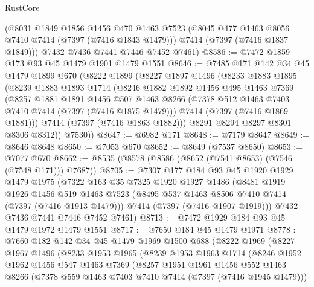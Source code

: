 \begin{lexlean}{RustCore}
\begin{coremodule}
      (@8031
        @1849
        @1856
        @1456
        @470
        @1463
        @7523
        (@8045 @477 @1463 @8056 @7410 @7414 (@7397 (@7416 @1843 @1479)))
        @7414
        (@7397 (@7416 @1837 @1849)))
      @7432
      @7436
      @7441
      @7446
      @7452
      @7461)
@8586 := @7472 @1859 @173 @93 @45 @1479 @1901 @1479 @1551
@8646 := @7485
    @171
    @142
    @34
    @45
    @1479
    @1899
    @670
    (@8222
      @1899
      (@8227
        @1897
        @1496
        (@8233
          @1883
          @1895
          (@8239
            @1883
            @1893
            @1714
            (@8246
              @1882
              @1892
              @1456
              @495
              @1463
              @7369
              (@8257
                @1881
                @1891
                @1456
                @507
                @1463
                @8266
                (@7378 @512 @1463 @7403 @7410 @7414 (@7397 (@7416 @1875 @1479)))
                @7414
                (@7397 (@7416 @1869 @1881)))
              @7414
              (@7397 (@7416 @1863 @1882)))
            @8291
            @8294
            @8297
            @8301
            @8306
            @8312))
        @7530))
@8647 := @6982 @171
@8648 := @7179 @8647
@8649 := @8646 @8648
@8650 := @7053 @670
@8652 := @8649 (@7537 @8650)
@8653 := @7077 @670
@8662 := @8535 (@8578 (@8586 (@8652 (@7541 @8653) (@7546 (@7548 @171))) @7687))
@8705 := @7307
    @177
    @184
    @93
    @45
    @1920
    @1929
    @1479
    @1975
    (@7322
      @163
      @35
      @7325
      @1920
      @1927
      @1486
      (@8481
        @1919
        @1926
        @1456
        @519
        @1463
        @7523
        (@8495 @537 @1463 @8506 @7410 @7414 (@7397 (@7416 @1913 @1479)))
        @7414
        (@7397 (@7416 @1907 @1919)))
      @7432
      @7436
      @7441
      @7446
      @7452
      @7461)
@8713 := @7472 @1929 @184 @93 @45 @1479 @1972 @1479 @1551
@8717 := @7650 @184 @45 @1479 @1971
@8778 := @7660
    @182
    @142
    @34
    @45
    @1479
    @1969
    @1500
    @688
    (@8222
      @1969
      (@8227
        @1967
        @1496
        (@8233
          @1953
          @1965
          (@8239
            @1953
            @1963
            @1714
            (@8246
              @1952
              @1962
              @1456
              @547
              @1463
              @7369
              (@8257
                @1951
                @1961
                @1456
                @552
                @1463
                @8266
                (@7378 @559 @1463 @7403 @7410 @7414 (@7397 (@7416 @1945 @1479)))

\end{coremodule}
\end{lexlean}
